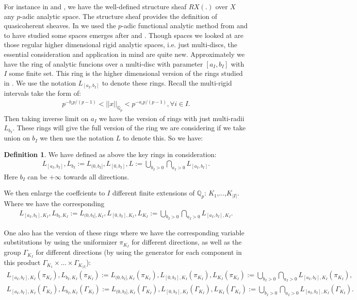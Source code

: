 \documentclass[12pt]{article}
\theoremstyle{definition}
\newtheorem{definition}{Definition}
\begin{document}
For instance in \cite{BBKK} and \cite{CS3}, we have the well-defined structure sheaf $RX(.)$ over $X$ any $p$-adic analytic space. The structure sheaf provides the definition of quasicoherent sheaves. In \cite{T} we used the $p$-adic functional analytic method from \cite{K1} and \cite{KL} to have studied some spaces emerges after \cite{CKZ} and \cite{PZ}. Though spaces we looked at are those regular higher dimensional rigid analytic spaces, i.e. just multi-discs, the essential consideration and application in mind are quite new. Approximately we have the ring of analytic funcions over a multi-disc with parameter $[a_I,b_I]$ with $I$ some finite set. This ring is the higher dimensional version of the rings studied in \cite{KPX}. We use the notation $L_{[a_I,b_I]}$ to denote these rings. Recall the multi-rigid intervals take the form of:
\begin{align}
p^{-b_i{p/(p-1)}}<||x||_{\mathbb{Q}_p}<p^{-a_i{p/(p-1)}}, \forall i \in I.
\end{align}
Then taking inverse limit on $a_I$ we have the version of rings with just multi-radii $L_{b_I}$. These rings will give the full version of the ring we are considering if we take union on $b_I$ we then use the notation $L$ to denote this. So we have:
\begin{definition} \label{definition1}
We have defined as above the key rings in consideration:
\begin{align}
L_{[a_I,b_I]},L_{b_I}:=L_{(0,b_I]},L_{[0,b_I]},L:=\bigcup_{b_I>0}\bigcap_{a_I>0}L_{[a_I,b_I]}.
\end{align}
Here $b_I$ can be $+\infty$ towards all directions.
\end{definition}


We then enlarge the coeffcients to $I$ different finite extensions of $\mathbb{Q}_p$: $K_1$,...,$K_{|I|}$. Where we have the corresponding  
\begin{align}
L_{[a_I,b_I],K_I},L_{b_I,K_I}:=L_{(0,b_I],K_I},L_{[0,b_I],K_I},L_{K_I}:=\bigcup_{b_I>0}\bigcap_{a_I>0}L_{[a_I,b_I],K_I}.
\end{align}

One also has the version of these rings where we have the corresponding variable substitutions by using the uniformizer $\pi_{K_I}$ for different directions, as well as the group $\Gamma_{K_I}$ for different directions (by using the generator for each component in this product $\Gamma_{K_1}\times...\times\Gamma_{K_{|I|}}$):
\begin{align}
L_{[a_I,b_I],K_I}(\pi_{K_I}),L_{b_I,K_I}(\pi_{K_I}):=L_{(0,b_I],K_I}(\pi_{K_I}),L_{[0,b_I],K_I}(\pi_{K_I}),L_{K_I}(\pi_{K_I}):=\bigcup_{b_I>0}\bigcap_{a_I>0}L_{[a_I,b_I],K_I}(\pi_{K_I}),
\end{align}
\begin{align}
L_{[a_I,b_I],K_I}(\Gamma_{K_I}),L_{b_I,K_I}(\Gamma_{K_I}):=L_{(0,b_I],K_I}(\Gamma_{K_I}),L_{[0,b_I],K_I}(\Gamma_{K_I}),L_{K_I}(\Gamma_{K_I}):=\bigcup_{b_I>0}\bigcap_{a_I>0}L_{[a_I,b_I],K_I}(\Gamma_{K_I}).
\end{align}
\end{document}
